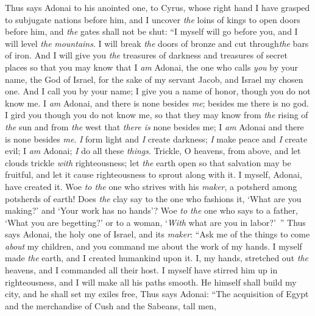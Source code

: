 \begin{biblechapter} %
\verse Thus says Adonai to his anointed one, 
to Cyrus, whose right hand I have grasped 
to subjugate nations before him, 
and I uncover \textit{the} loins of kings 
to open doors before him, 
and \textit{the} gates shall not be shut:
\verse “I myself will go before you, 
and I will level \textit{the} \textit{mountains}. 
I will break \textit{the} doors of bronze 
and cut through\textit{the} bars of iron.
\verse And I will give you \textit{the} treasures of darkness 
and treasures of secret places 
so that you may know that I \textit{am} Adonai, 
the one who calls \textit{you} by your name, the God of Israel,
\verse for the sake of my servant Jacob, 
and Israel my chosen one. 
And I call you by your name; 
I give you a name of honor, though you do not know me.
\verse I \textit{am} Adonai, and there is none besides \textit{me}; 
besides me there is no god. 
I gird you though you do not know me,
\verse so that they may know from \textit{the} rising of \textit{the} sun 
and from \textit{the} west that \textit{there is} none besides me; 
I \textit{am} Adonai and there is none besides \textit{me}.
\verse \textit{I} form light and \textit{I} create darkness; 
\textit{I} make peace and \textit{I} create evil; 
I \textit{am} Adonai; \textit{I} do all these \textit{things}.
\verse Trickle, O heavens, from above, 
and let clouds trickle \textit{with} righteousness; 
let \textit{the} earth open so that salvation may be fruitful, 
and let it cause righteousness to sprout along with it. 
I myself, Adonai, have created it.
\verse Woe \textit{to the} one who strives with his \textit{maker}, 
a potsherd among potsherds of earth! 
Does \textit{the} clay say to the one who fashions it, 
‘What are you making?’ 
and ‘Your work has no hands’?
\verse Woe \textit{to the} one who says to a father, ‘What you are begetting?’ 
or to a woman, ‘\textit{With} what are you in labor?’ ”
\verse Thus says Adonai, the holy one of Israel, 
and its \textit{maker}: 
“Ask me of the things to come \textit{about} my children, 
and you command me about the work of my hands.
\verse I myself made \textit{the} earth, 
and I created humankind upon it. 
I, my hands, stretched out \textit{the} heavens, 
and I commanded all their host.
\verse I myself have stirred him up in righteousness, 
and I will make all his paths smooth. 
He himself shall build my city, 
and he shall set my exiles free,
 Thus says Adonai: 
“The acquisition of Egypt 
and the merchandise of Cush 
and the Sabeans, tall men, 

\end{biblechapter}
